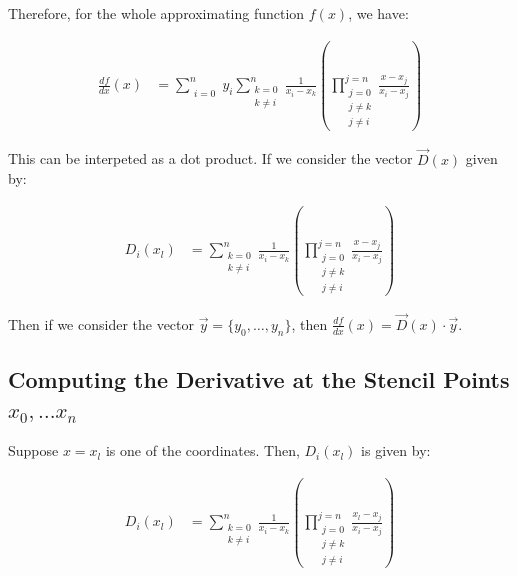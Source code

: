 \documentclass{article}
\begin{document}
Therefore, for the whole approximating function $f(x)$, we have:

\begin{align}
\frac{df}{dx}(x) & = \sum_{\begin{matrix}i=0\end{matrix}}^n
	y_i
	\sum_{\begin{matrix}k=0\\k\neq i\end{matrix}}^n
	\frac{1}{x_i - x_k}
	\left( \prod_{
		\begin{matrix} j = 0 \\ j \neq k\\j \neq i \end{matrix}}^{j=n}
		\frac{x - x_j}{x_i - x_j} \right)
\end{align}

This can be interpeted as a dot product.
If we consider the vector $\vec{D}(x)$ given by:

\begin{align}
D_i(x_l) & = 
	\sum_{\begin{matrix}k=0\\k\neq i\end{matrix}}^n
	\frac{1}{x_i - x_k}
	\left( \prod_{
		\begin{matrix} j = 0 \\ j \neq k\\j \neq i \end{matrix}}^{j=n}
		\frac{x - x_j}{x_i - x_j} \right)
\end{align}

Then if we consider the vector $\vec{y} = \{ y_0, \dots, y_n \}$,
	then $\frac{df}{dx}(x) = \vec{D}(x) \cdot \vec{y}$.

\subsection{Computing the Derivative at the Stencil Points $x_0, \dots x_n$}
  
Suppose $x = x_l$ is one of the coordinates.
Then, $D_i(x_l)$ is given by:

\begin{align}
D_i(x_l) & = 
	\sum_{\begin{matrix}k=0\\k\neq i\end{matrix}}^n
	\frac{1}{x_i - x_k}
	\left( \prod_{
		\begin{matrix} j = 0 \\ j \neq k\\j \neq i \end{matrix}}^{j=n}
		\frac{x_l - x_j}{x_i - x_j} \right)
\end{align}
\end{document}
